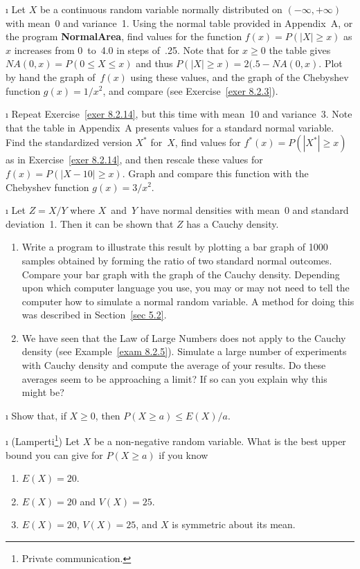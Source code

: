 {\begin{LJSItem}
\i\label{exer 8.2.14} Let $X$ be a continuous random variable normally
distributed on $(-\infty,+\infty)$ with mean~0 and variance~1.  Using the normal
table provided in Appendix~A, or the program {\bf NormalArea},
find values for the function $f(x) = P(|X| \geq x)$ as $x$ increases from
0~to~4.0 in steps of~.25.  Note that for $x \geq 0$ the table gives
$ NA(0,x) = P(0 \leq X \leq x)$ and thus $P(|X| \geq x) = 2(.5 - NA(0,x)$.
Plot by hand
the graph of~$f(x)$ using these values, and the graph of the Chebyshev function
$g(x) = 1/x^2$, and compare (see Exercise~\ref{exer 8.2.3}).

\i\label{exer 8.2.109} Repeat Exercise~\ref{exer 8.2.14}, but this time with mean~10 and
variance~3.  Note that the table in Appendix~A presents values for
a standard normal variable.  Find the standardized version $X^*$ for~$X$, find
values for $f^*(x) = P(|X^*| \geq x)$ as in Exercise~\ref{exer 8.2.14}, and
then rescale these values for $f(x) = P(|X -10| \geq x)$.  Graph and compare
this function with the Chebyshev function $g(x) = 3/x^2$.

\i\label{exer 8.2.110} Let $Z = X/Y$ where $X$~and~$Y$ have normal densities with mean~0 and
standard deviation~1.  Then it can be shown that $Z$ has a Cauchy density.
\begin{enumerate}
\item Write a program to illustrate this result by plotting a bar graph of
1000 samples obtained by forming the ratio of two standard normal outcomes. 
Compare your bar graph with the graph of the Cauchy density.  Depending upon which
computer language you use, you may or may not need to tell the computer how to simulate a
normal random variable.  A method for doing this was described in Section~\ref{sec 5.2}.

\item We have seen that the Law of Large Numbers does not apply to the
Cauchy density (see Example~\ref{exam 8.2.5}).  Simulate a large number of
experiments with Cauchy density and compute the average of your results.  Do
these averages seem to be approaching a limit?  If so can you explain why this
might be?
\end{enumerate}

\i\label{exer 8.2.111} Show that, if $X \geq 0$, then $P(X \geq a) \leq E(X)/a$.

\i\label{exer 8.2.112} (Lamperti\footnote{Private communication.})
 Let $X$ be a non-negative random
variable.  What is the best upper bound you can give for $P(X \geq a)$ if you know
\begin{enumerate}
\item $E(X) = 20$.

\item $E(X) = 20$ and $V(X) = 25$.

\item $E(X) = 20$, $V(X) = 25$, and $X$ is symmetric about its mean.
\end{enumerate}
\end{LJSItem}}
